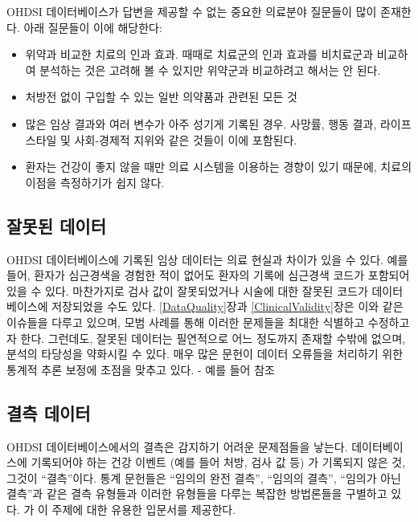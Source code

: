 \documentclass[11pt]{book}
\providecommand{\tightlist}{%
  \setlength{\itemsep}{0pt}\setlength{\parskip}{0pt}}
\theoremstyle{definition}
\theoremstyle{definition}
\theoremstyle{definition}
\theoremstyle{remark}
\begin{document}

OHDSI 데이터베이스가 답변을 제공할 수 없는 중요한 의료분야 질문들이 많이
존재한다. 아래 질문들이 이에 해당한다:

\begin{itemize}
\tightlist
\item
  위약과 비교한 치료의 인과 효과. 때때로 치료군의 인과 효과를 비치료군과
  비교하여 분석하는 것은 고려해 볼 수 있지만 위약군과 비교하려고 해서는
  안 된다.
\item
  처방전 없이 구입할 수 있는 일반 의약품과 관련된 모든 것
\item
  많은 임상 결과와 여러 변수가 아주 성기게 기록된 경우. 사망률, 행동
  결과, 라이프 스타일 및 사회-경제적 지위와 같은 것들이 이에 포함된다.
\item
  환자는 건강이 좋지 않을 때만 의료 시스템을 이용하는 경향이 있기
  때문에, 치료의 이점을 측정하기가 쉽지 않다.
\end{itemize}

\subsection{잘못된 데이터}\label{-}

OHDSI 데이터베이스에 기록된 임상 데이터는 의료 현실과 차이가 있을 수
있다. 예를 들어, 환자가 심근경색을 경험한 적이 없어도 환자의 기록에
심근경색 코드가 포함되어 있을 수 있다. 마찬가지로 검사 값이 잘못되었거나
시술에 대한 잘못된 코드가 데이터베이스에 저장되었을 수도 있다.
\ref{DataQuality}장과 \ref{ClinicalValidity}장은 이와 같은 이슈들을
다루고 있으며, 모범 사례를 통해 이러한 문제들을 최대한 식별하고
수정하고자 한다. 그런데도, 잘못된 데이터는 필연적으로 어느 정도까지
존재할 수밖에 없으며, 분석의 타당성을 약화시킬 수 있다. 매우 많은 문헌이
데이터 오류들을 처리하기 위한 통계적 추론 보정에 초점을 맞추고 있다. -
예를 들어 \citet{fuller2009measurement} 참조

\subsection{결측 데이터}\label{-}


OHDSI 데이터베이스에서의 결측은 감지하기 어려운 문제점들을 낳는다.
데이터베이스에 기록되어야 하는 건강 이벤트 (예를 들어 처방, 검사 값 등)
가 기록되지 않은 것, 그것이 ``결측''이다. 통계 문헌들은 ``임의의 완전
결측'', ``임의의 결측'', ``임의가 아닌 결측''과 같은 결측 유형들과
이러한 유형들을 다루는 복잡한 방법론들을 구별하고 있다.
\citet{perkins2017principled} 가 이 주제에 대한 유용한 입문서를
제공한다.
\end{document}
